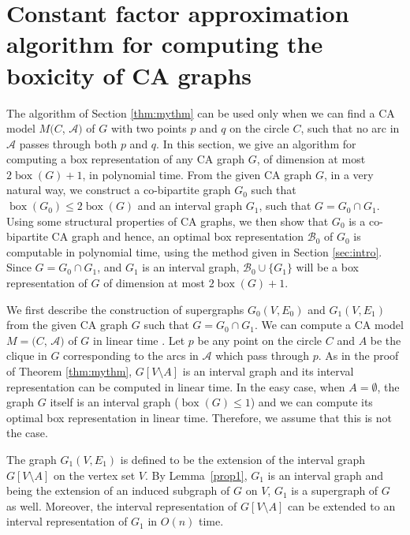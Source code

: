 \section[Approximating the boxicity of CA graphs]{Constant factor approximation algorithm for computing the boxicity of CA graphs}\label{sapprox}
 The algorithm of Section \ref{thm:mythm} can be used only when we can find a CA model $M(C$, $\mathcal{A})$ of $G$ with two points $p$ and $q$ on 
 the circle $C$, such that no arc in $\mathcal{A}$ passes through both $p$ and $q$. In this section, we give an algorithm for computing a box representation 
 of any CA graph $G$, of dimension at most $2 \operatorname{box}(G)+1$, in polynomial time. From the given CA graph $G$, in a very natural way, we construct 
 a co-bipartite graph $G_0$ such that $\operatorname{box}(G_0) \le 2 \operatorname{box}(G)$ and an interval graph $G_1$, such that $G = G_0 \cap G_1$. 
 Using some structural properties of CA graphs, we then show that $G_0$ is a co-bipartite CA graph and hence, an optimal box representation $\mathcal{B}_0$ of 
 $G_0$ is computable in polynomial time, using the method given in Section \ref{sec:intro}. 
 Since $G = G_0 \cap G_1$, and $G_1$ is an interval graph, $\mathcal{B}_0 \cup \{G_1\}$ will be a box representation of $G$ of dimension at most $2 \operatorname{box}(G)+1$. 

 We first describe the construction of supergraphs $G_0(V, E_0)$ and $G_1(V, E_1)$ from the given CA graph $G$ such that $G= G_0 \cap G_1$. 
 We can compute a CA model $M=(C$, $\mathcal A)$ of $G$ in linear time \cite{Ross1}. Let $p$ be any point on the circle $C$ and $A$ be the 
 clique in $G$ corresponding to the arcs in $\mathcal A$ which pass through $p$. As in the proof of Theorem \ref{thm:mythm}, $G[V \setminus A]$ is an interval graph and its interval representation can be computed in linear time. In the easy case, when $A=\emptyset$, the graph $G$ itself is an interval graph ($\operatorname{box}(G) \le 1$) and we can compute its optimal box representation in linear time. Therefore, we assume that this is not the case. 

 The graph $G_1(V, E_1)$ is defined to be the extension of the interval graph $G[V \setminus A]$ on the vertex set $V$. By Lemma~\ref{prop1}, $G_1$ is an interval graph and being the extension of an induced subgraph of $G$ on $V$, $G_1$ is a supergraph of $G$ as well. Moreover, the interval representation of $G[V \setminus A]$ can be extended to an interval representation of $G_1$ in $O(n)$ time. 

